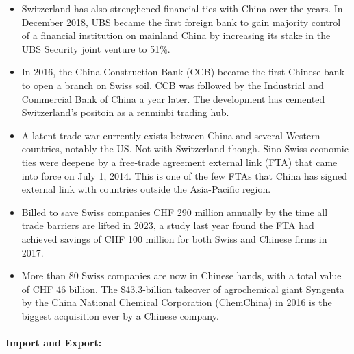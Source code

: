 \begin{itemize}
    \item Switzerland has also strenghened financial ties with China over the
        years. In December 2018, UBS became the first foreign bank to gain
        majority control of a financial institution on mainland China by increasing
        its stake in the UBS Security joint venture to 51\%.
    \item In 2016, the China Construction Bank (CCB) became the first Chinese
        bank to open a branch on Swiss soil. CCB was followed by the Industrial
        and Commercial Bank of China a year later. The development has cemented
        Switzerland's positoin as a renminbi trading hub.
    \item A latent trade war currently exists between China and several Western
        countries, notably the US. Not with Switzerland though. Sino-Swiss
        economic ties were deepene by a free-trade agreement external link
        (FTA) that came into force on July 1, 2014. This is one of the few FTAs
        that China has signed external link with countries outside the
        Asia-Pacific region.
    \item Billed to save Swiss companies CHF 290 million annually by the time all
        trade barriers are lifted in 2023, a study last year found the FTA
        had achieved savings of CHF 100 million for both Swiss and Chinese
        firms in 2017.
    \item More than 80 Swiss companies are now in Chinese hands, with a total
        value of CHF 46 billion. The \$43.3-billion takeover of agrochemical
        giant Syngenta by the China National Chemical Corporation (ChemChina)
        in 2016 is the biggest acquisition ever by a Chinese company.
\end{itemize}

\paragraph{Import and Export:}

